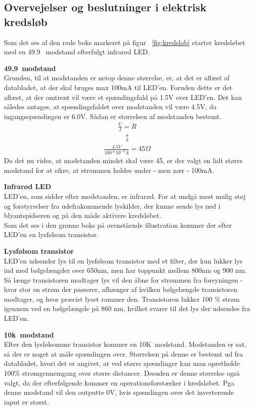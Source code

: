 \subsection{Overvejelser og beslutninger i elektrisk kredsløb}

Som det ses af den røde boks markeret på figur ~\ref{fig:kredslob} starter kredsløbet med en 49.9 \textOmega\ modstand efterfulgt infrarød LED.

\textbf{49,9\textOmega\ modstand}\\
Grunden, til at modstanden er netop denne størrelse, er, at det er aflæst af databladet, at der skal bruges max 100mA til LED'en. Foruden dette er det aflæst, at der omtrent vil være et spændingsfald på 1.5V over LED'en. Det kan således antages, at spændingsfaldet over modstanden vil være 4.5V, da ingangsspændingen er 6.0V.
Sådan er størrelsen af modstanden bestemt. 
\begin{align}
	\frac{U}{I}=R
\end{align}
\begin{align*}
\updownarrow
\end{align*}
\begin{align}
\frac{4.5V}{100*10^{-3}A}=45\Omega
\end{align}
Da det nu vides, at modstanden mindst skal være 45\textOmega , er der valgt en lidt større modstand for at sikre, at strømmen holdes under - men nær - 100mA.\linebreak

\textbf{Infrarød LED}\\
LED'en, som sidder efter modstanden, er infrarød. For at undgå mest mulig støj og forstyrrelser fra udefrakommende lyskilder, der kunne sende lys ned i blyantspidseren og på den måde aktivere kredsløbet. \\
Som det ses i den grønne boks på ovenstående illustration kommer der efter LED'en en lysfølsom transistor.

\textbf{Lysfølsom transistor} \\
LED’en udsender lys til en lysfølsom transistor med et filter, der kun lukker lys ind med bølgelængder over 650nm, men har toppunkt mellem 800nm og 900 nm. Så længe transistoren modtager lys vil den åbne for strømmen fra forsyningen - hvor stor en strøm der passerer, afhænger af hvilken bølgelængde transistoren modtager, og hvor præcist lyset rammer den. Transistoren lukker 100 \% strøm igennem ved en bølgelængde på 860 nm, hvilket svarer til det lys der udsendes fra LED'en.

\textbf{10k\textOmega\ modstand} \\
Efter den lysfølsomme transistor kommer en 10K\textOmega\ modstand.
Modstanden er sat, så der er noget at måle spændingen over. Størrelsen på denne er bestemt ud fra databladet, hvori det er angivet, at ved større spændinger kan man opretholde 100\% strømgennemgang over større distancer. Desuden er denne størrelse også valgt, da der efterfølgende kommer en operationsforstærker i kredsløbet. Pga denne modstand vil den outputte 0V, hvis spændingen over det inverterende input er størst.

